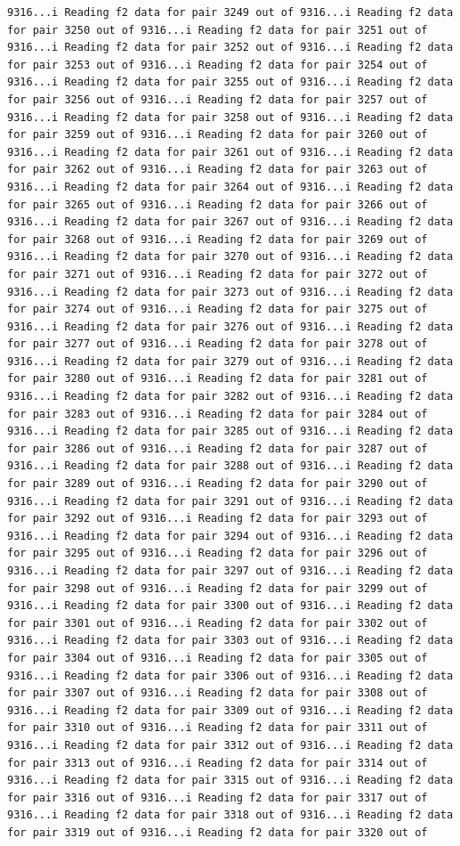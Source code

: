 \documentclass[
]{article}
\begin{document}
\begin{verbatim}
9316...i Reading f2 data for pair 3249 out of 9316...i Reading f2 data for pair 3250 out of 9316...i Reading f2 data for pair 3251 out of 9316...i Reading f2 data for pair 3252 out of 9316...i Reading f2 data for pair 3253 out of 9316...i Reading f2 data for pair 3254 out of 9316...i Reading f2 data for pair 3255 out of 9316...i Reading f2 data for pair 3256 out of 9316...i Reading f2 data for pair 3257 out of 9316...i Reading f2 data for pair 3258 out of 9316...i Reading f2 data for pair 3259 out of 9316...i Reading f2 data for pair 3260 out of 9316...i Reading f2 data for pair 3261 out of 9316...i Reading f2 data for pair 3262 out of 9316...i Reading f2 data for pair 3263 out of 9316...i Reading f2 data for pair 3264 out of 9316...i Reading f2 data for pair 3265 out of 9316...i Reading f2 data for pair 3266 out of 9316...i Reading f2 data for pair 3267 out of 9316...i Reading f2 data for pair 3268 out of 9316...i Reading f2 data for pair 3269 out of 9316...i Reading f2 data for pair 3270 out of 9316...i Reading f2 data for pair 3271 out of 9316...i Reading f2 data for pair 3272 out of 9316...i Reading f2 data for pair 3273 out of 9316...i Reading f2 data for pair 3274 out of 9316...i Reading f2 data for pair 3275 out of 9316...i Reading f2 data for pair 3276 out of 9316...i Reading f2 data for pair 3277 out of 9316...i Reading f2 data for pair 3278 out of 9316...i Reading f2 data for pair 3279 out of 9316...i Reading f2 data for pair 3280 out of 9316...i Reading f2 data for pair 3281 out of 9316...i Reading f2 data for pair 3282 out of 9316...i Reading f2 data for pair 3283 out of 9316...i Reading f2 data for pair 3284 out of 9316...i Reading f2 data for pair 3285 out of 9316...i Reading f2 data for pair 3286 out of 9316...i Reading f2 data for pair 3287 out of 9316...i Reading f2 data for pair 3288 out of 9316...i Reading f2 data for pair 3289 out of 9316...i Reading f2 data for pair 3290 out of 9316...i Reading f2 data for pair 3291 out of 9316...i Reading f2 data for pair 3292 out of 9316...i Reading f2 data for pair 3293 out of 9316...i Reading f2 data for pair 3294 out of 9316...i Reading f2 data for pair 3295 out of 9316...i Reading f2 data for pair 3296 out of 9316...i Reading f2 data for pair 3297 out of 9316...i Reading f2 data for pair 3298 out of 9316...i Reading f2 data for pair 3299 out of 9316...i Reading f2 data for pair 3300 out of 9316...i Reading f2 data for pair 3301 out of 9316...i Reading f2 data for pair 3302 out of 9316...i Reading f2 data for pair 3303 out of 9316...i Reading f2 data for pair 3304 out of 9316...i Reading f2 data for pair 3305 out of 9316...i Reading f2 data for pair 3306 out of 9316...i Reading f2 data for pair 3307 out of 9316...i Reading f2 data for pair 3308 out of 9316...i Reading f2 data for pair 3309 out of 9316...i Reading f2 data for pair 3310 out of 9316...i Reading f2 data for pair 3311 out of 9316...i Reading f2 data for pair 3312 out of 9316...i Reading f2 data for pair 3313 out of 9316...i Reading f2 data for pair 3314 out of 9316...i Reading f2 data for pair 3315 out of 9316...i Reading f2 data for pair 3316 out of 9316...i Reading f2 data for pair 3317 out of 9316...i Reading f2 data for pair 3318 out of 9316...i Reading f2 data for pair 3319 out of 9316...i Reading f2 data for pair 3320 out of 
\end{verbatim}
\end{document}
